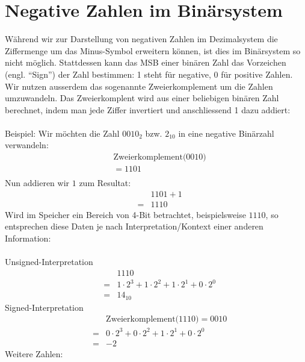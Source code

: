 \documentclass[a4paper,10pt]{report}
\begin{document}
\section{Negative Zahlen im Binärsystem}
Während wir zur Darstellung von negativen Zahlen im Dezimalsystem die Ziffermenge um das Minus-Symbol erweitern können, ist dies im Binärsystem so nicht möglich. Stattdessen kann das MSB einer binären Zahl das Vorzeichen (engl. "`Sign"') der Zahl bestimmen: 1 steht für negative, 0 für positive Zahlen. Wir nutzen ausserdem das sogenannte Zweierkomplement um die Zahlen umzuwandeln. Das Zweierkomplent wird aus einer beliebigen binären Zahl berechnet, indem man jede Ziffer invertiert und anschliessend 1 dazu addiert:\\
\\
Beispiel: Wir möchten die Zahl $0010_2$ bzw. $2_{10}$ in eine negative Binärzahl verwandeln:
\begin{eqnarray*}
&\mbox{Zweierkomplement(}0010\mbox{)} \\
&= 1101\\
\end{eqnarray*}
Nun addieren wir $1$ zum Resultat:
\begin{eqnarray*}
&& 1101 + 1\\
&=& 1110
\end{eqnarray*}
Wird im Speicher ein Bereich von 4-Bit betrachtet, beispielsweise $1110$, so entsprechen diese Daten je nach Interpretation/Kontext einer anderen Information:\\ \\
Unsigned-Interpretation
\begin{eqnarray*}&&1110 \\
&=& 1 \cdot 2^3 + 1 \cdot 2^2 + 1 \cdot 2^1 + 0 \cdot 2^0 \\
&=& 14_{10} \end{eqnarray*}
Signed-Interpretation
\begin{eqnarray*}&& \mbox{Zweierkomplement(} 1110\mbox{)} = 0010 \\
&=& 0 \cdot 2^3 + 0 \cdot 2^2 + 1 \cdot 2^1 + 0 \cdot 2^0 \\
&=& -2 
\end{eqnarray*}
Weitere Zahlen:
\end{document}
